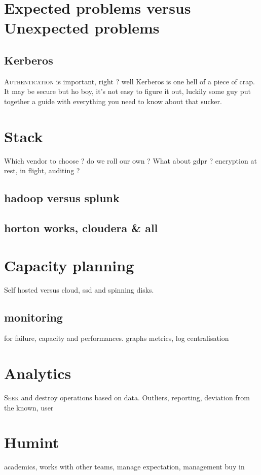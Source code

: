 \documentclass[a4paper,12pt]{article}
\begin{document}
\section{Expected problems versus Unexpected problems}
\subsection{Kerberos}
\lettrine{A}{uthentication} is important, right ? well Kerberos is one hell of a piece of crap.
It may be secure but ho boy, it's not easy to figure it out, luckily some guy put together a guide with everything you need to know about that sucker.
\newpage
\section{Stack}
Which vendor to choose ? do we roll our own ? 
What about gdpr ? encryption at rest, in flight, auditing ? 
\subsection{hadoop versus splunk}
\subsection{horton works, cloudera \& all}
\newpage
\section{Capacity planning}
Self hosted versus cloud, ssd and spinning disks.
\subsection{monitoring}
for failure, capacity and performances.
graphs metrics, log centralisation
\newpage
\section{Analytics}
\lettrine{S}{eek} and destroy operations based on data.
Outliers, reporting, deviation from the known, user 
\section{Humint}
academics, works with other teams, manage expectation, management buy in
\end{document}
